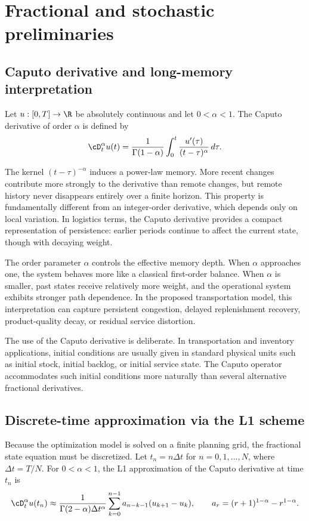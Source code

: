 \section{Fractional and stochastic preliminaries}
\subsection{Caputo derivative and long-memory interpretation}
\begin{definition}
Let $u:[0,T]\to\R$ be absolutely continuous and let $0<\alpha<1$. The Caputo derivative of order $\alpha$ is defined by
\begin{equation}
\cD_t^{\alpha}u(t)=\frac{1}{\Gamma(1-\alpha)}\int_0^t\frac{u'(\tau)}{(t-\tau)^{\alpha}}\,d\tau.
\end{equation}
\end{definition}

The kernel $(t-\tau)^{-\alpha}$ induces a power-law memory. More recent changes contribute more strongly to the derivative than remote changes, but remote history never disappears entirely over a finite horizon. This property is fundamentally different from an integer-order derivative, which depends only on local variation. In logistics terms, the Caputo derivative provides a compact representation of persistence: earlier periods continue to affect the current state, though with decaying weight.

The order parameter $\alpha$ controls the effective memory depth. When $\alpha$ approaches one, the system behaves more like a classical first-order balance. When $\alpha$ is smaller, past states receive relatively more weight, and the operational system exhibits stronger path dependence. In the proposed transportation model, this interpretation can capture persistent congestion, delayed replenishment recovery, product-quality decay, or residual service distortion.

\begin{remark}
The use of the Caputo derivative is deliberate. In transportation and inventory applications, initial conditions are usually given in standard physical units such as initial stock, initial backlog, or initial service state. The Caputo operator accommodates such initial conditions more naturally than several alternative fractional derivatives.
\end{remark}

\subsection{Discrete-time approximation via the L1 scheme}
Because the optimization model is solved on a finite planning grid, the fractional state equation must be discretized. Let $t_n=n\Delta t$ for $n=0,1,\dots,N$, where $\Delta t=T/N$. For $0<\alpha<1$, the L1 approximation of the Caputo derivative at time $t_n$ is
\begin{equation}
\cD_t^{\alpha}u(t_n)\approx
\frac{1}{\Gamma(2-\alpha)\Delta t^{\alpha}}
\sum_{k=0}^{n-1}a_{n-k-1}(u_{k+1}-u_k),
\qquad a_r=(r+1)^{1-\alpha}-r^{1-\alpha}.
\end{equation}

